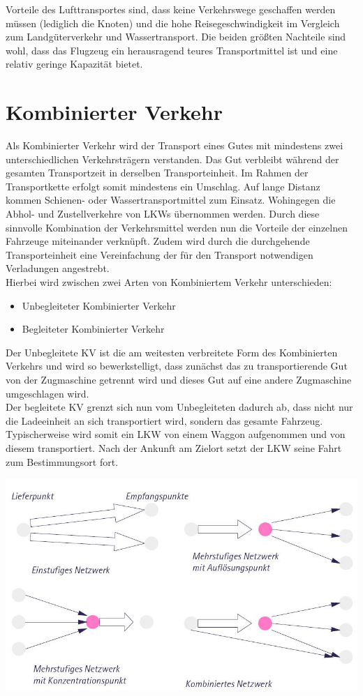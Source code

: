 \documentclass[a4paper,12pt]{scrreprt}
\begin{document}
	Vorteile des Lufttransportes sind, dass keine Verkehrswege geschaffen werden müssen (lediglich die Knoten) und die hohe Reisegeschwindigkeit im Vergleich zum Landgüterverkehr und  Wassertransport. Die beiden größten Nachteile sind wohl, dass das Flugzeug ein herausragend teures Transportmittel ist und eine relativ geringe Kapazität bietet.
	 
	\section{Kombinierter Verkehr}
	Als Kombinierter Verkehr wird der Transport eines Gutes mit mindestens zwei unterschiedlichen Verkehrsträgern verstanden. Das Gut verbleibt während der gesamten Transportzeit in derselben Transporteinheit. Im Rahmen der Transportkette erfolgt somit mindestens ein Umschlag. Auf lange Distanz kommen Schienen- oder Wassertransportmittel zum Einsatz. Wohingegen die Abhol- und Zustellverkehre von LKWs übernommen werden. Durch diese sinnvolle Kombination der Verkehrsmittel werden nun die Vorteile der einzelnen Fahrzeuge miteinander verknüpft. Zudem wird durch die durchgehende Transporteinheit eine Vereinfachung der für den Transport notwendigen Verladungen angestrebt. \\
	
	Hierbei wird zwischen zwei Arten von Kombiniertem Verkehr unterschieden:
	\begin{itemize}
	\item Unbegleiteter Kombinierter Verkehr
	\item Begleiteter Kombinierter Verkehr
	\end{itemize}
	
	Der Unbegleitete KV ist die am weitesten verbreitete Form des Kombinierten Verkehrs und wird so bewerkstelligt, dass zunächst das zu transportierende Gut von der Zugmaschine getrennt wird und dieses Gut auf eine andere Zugmaschine umgeschlagen wird. \\
	
	Der begleitete KV grenzt sich nun vom Unbegleiteten dadurch ab, dass nicht nur die Ladeeinheit an sich transportiert wird, sondern das gesamte Fahrzeug. Typischerweise wird somit ein LKW von einem Waggon aufgenommen und von diesem transportiert. Nach der Ankunft am Zielort setzt der LKW seine Fahrt zum Bestimmungsort fort. 
	
	\begin{center}
	\includegraphics[width=0.7\linewidth]{./Bilder/KV}
	\end{center}
\end{document}
